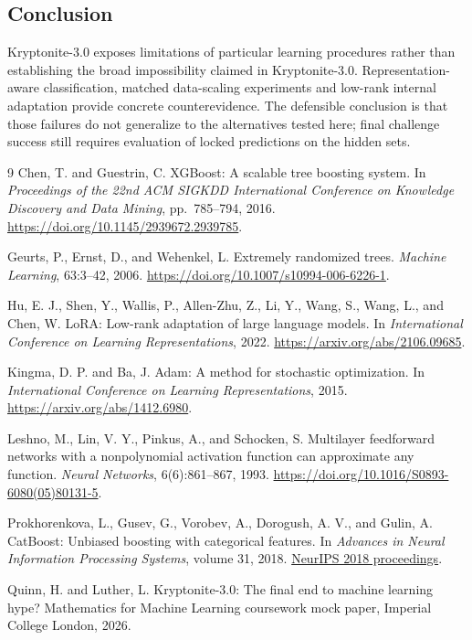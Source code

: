 \documentclass{article}
\begin{document}
\subsection{Conclusion}
Kryptonite-3.0 exposes limitations of particular learning procedures rather than establishing the broad impossibility claimed in Kryptonite-3.0. Representation-aware classification, matched data-scaling experiments and low-rank internal adaptation provide concrete counterevidence. The defensible conclusion is that those failures do not generalize to the alternatives tested here; final challenge success still requires evaluation of locked predictions on the hidden sets.

\clearpage
\begin{thebibliography}{9}
Chen, T. and Guestrin, C.
XGBoost: A scalable tree boosting system.
In \emph{Proceedings of the 22nd ACM SIGKDD International Conference on Knowledge Discovery and Data Mining}, pp.\ 785--794, 2016.
\url{https://doi.org/10.1145/2939672.2939785}.

Geurts, P., Ernst, D., and Wehenkel, L.
Extremely randomized trees.
\emph{Machine Learning}, 63:3--42, 2006.
\url{https://doi.org/10.1007/s10994-006-6226-1}.

Hu, E. J., Shen, Y., Wallis, P., Allen-Zhu, Z., Li, Y., Wang, S., Wang, L., and Chen, W.
LoRA: Low-rank adaptation of large language models.
In \emph{International Conference on Learning Representations}, 2022.
\url{https://arxiv.org/abs/2106.09685}.

Kingma, D. P. and Ba, J.
Adam: A method for stochastic optimization.
In \emph{International Conference on Learning Representations}, 2015.
\url{https://arxiv.org/abs/1412.6980}.

Leshno, M., Lin, V. Y., Pinkus, A., and Schocken, S.
Multilayer feedforward networks with a nonpolynomial activation function can approximate any function.
\emph{Neural Networks}, 6(6):861--867, 1993.
\url{https://doi.org/10.1016/S0893-6080(05)80131-5}.

Prokhorenkova, L., Gusev, G., Vorobev, A., Dorogush, A. V., and Gulin, A.
CatBoost: Unbiased boosting with categorical features.
In \emph{Advances in Neural Information Processing Systems}, volume 31, 2018.
\href{https://proceedings.neurips.cc/paper/2018/hash/14491b756b3a51daac41c24863285549-Abstract.html}{NeurIPS 2018 proceedings}.

Quinn, H. and Luther, L.
Kryptonite-3.0: The final end to machine learning hype?
Mathematics for Machine Learning coursework mock paper, Imperial College London, 2026.
\end{thebibliography}
\end{document}
